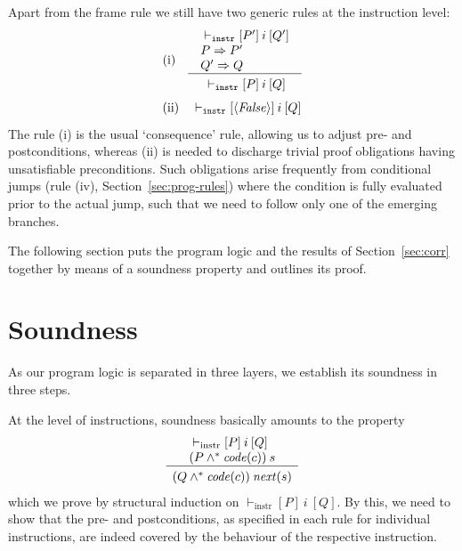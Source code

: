 \documentclass[sigplan,10pt,review]{acmart}\settopmatter{printfolios=true,printccs=false,printacmref=false}
\newcommand{\subpred}{\Rightarrow}
\newcommand{\sconj}{\wedge^*}
\newcommand{\ttrip}[5]{\mathit{#1} \vdash_{\mathrm{#2}}[#3]\:#4\:[#5]}
\newcommand{\xnext}{\mathit{next}}
\newcommand{\code}[1]{\mathit{code}(#1)}
\newcommand{\pure}[1]{\langle#1\rangle}
\newcommand{\RuleC}[2]{\begin{array}{c}#1\\\hline\noalign{\smallskip}#2\end{array}}
\begin{document}
Apart from the frame rule we still have two generic rules at the instruction level:
\[
\begin{array}{l l}
\mbox{(i)} & \RuleC{\begin{array}{l}
                     \ttrip{}{\mathtt{instr}}{P'}{i}{Q'} \\
                     P \subpred P' \\ 
                     Q' \subpred Q
                     \end{array}}{\ttrip{}{\mathtt{instr}}{P}{i}{Q}}
\end{array}
\]
\[
\begin{array}{l l}
\mbox{(ii)} & \ttrip{}{\mathtt{instr}}{\pure{\mathit{False}}}{i}{Q} 
\end{array}
\]
The rule (i) is the usual `consequence' rule, allowing us to adjust pre- and
postconditions, whereas (ii) is needed to discharge trivial 
proof obligations having unsatisfiable preconditions. Such obligations 
arise frequently from conditional jumps (rule (iv), Section~\ref{sec:prog-rules})
where the condition is fully evaluated prior to the actual jump, such that
we need to follow only one of the emerging branches.

The following section puts the program logic and the results of Section~\ref{sec:corr}
together by means of a soundness property and outlines its proof. 
%
\section{Soundness}
\label{sec:sound}
As our program logic is separated in three layers, we establish its soundness in three steps.

At the level of instructions, soundness basically amounts to the property
\begin{equation}
\label{prop:sound-instr}
\RuleC{\begin{array}{l}
         \ttrip{}{instr}{P}{i}{Q} \\
         (P \sconj \code{c})\: s
       \end{array}}
 {(Q \sconj \code{c})\: \xnext(s)}
\end{equation}
which we prove by structural induction on $\ttrip{}{instr}{P}{i}{Q}$. 
By this, we need to show that the pre- and postconditions, as specified in each 
rule for individual instructions, are indeed covered by the behaviour of 
the respective instruction.    
\end{document}
